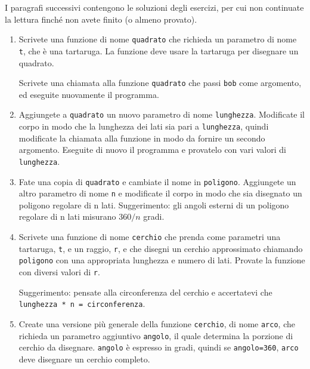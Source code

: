 \documentclass[10pt]{book}
\begin{document}
I paragrafi successivi contengono le soluzioni degli esercizi, per cui non continuate la lettura finché non avete finito (o almeno provato).

\begin{enumerate}

\item Scrivete una funzione di nome {\tt quadrato} che richieda un parametro di nome {\tt t}, che è una tartaruga. La funzione deve usare la tartaruga per disegnare un quadrato.

Scrivete una chiamata alla funzione {\tt quadrato} che passi {\tt bob} come argomento, ed eseguite nuovamente il programma.

\item Aggiungete a {\tt quadrato} un nuovo parametro di nome {\tt lunghezza}.
Modificate il corpo in modo che la lunghezza dei lati sia pari a {\tt lunghezza}, quindi modificate la chiamata alla funzione in modo da fornire un secondo argomento. Eseguite di nuovo il programma e provatelo con vari valori di {\tt
lunghezza}.

\item Fate una copia di {\tt quadrato} e cambiate il nome in {\tt poligono}.  Aggiungete un altro parametro di nome {\tt n} e modificate il corpo in modo che sia disegnato un poligono regolare di n lati. Suggerimento: gli angoli esterni di un poligono regolare di n lati misurano $360/n$ gradi.

\item Scrivete una funzione di nome {\tt cerchio} che prenda come parametri una tartaruga, {\tt t}, e un raggio, {\tt r}, e che disegni un cerchio approssimato chiamando {\tt poligono} con una appropriata lunghezza e numero di lati. Provate la funzione con diversi valori di {\tt r}.

Suggerimento: pensate alla circonferenza del cerchio e accertatevi che
{\tt lunghezza * n = circonferenza}.

\item Create una versione più generale della funzione {\tt cerchio}, di nome {\tt arco}, che richieda un parametro aggiuntivo {\tt angolo}, il quale determina la porzione di cerchio da disegnare.  {\tt angolo} è espresso in gradi, quindi se {\tt angolo=360}, {\tt arco} deve disegnare un cerchio completo.

\end{enumerate}
\end{document}
